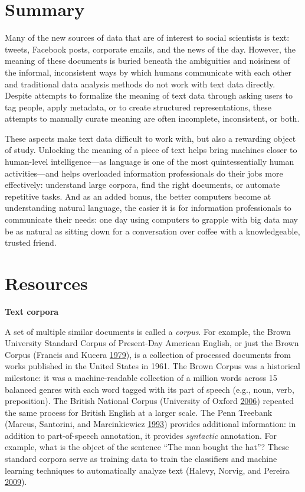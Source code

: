 \documentclass[]{krantz}
\begin{document}
\section{Summary}\label{summary-4}

Many of the new sources of data that are of interest to social
scientists is text: tweets, Facebook posts, corporate emails, and the
news of the day. However, the meaning of these documents is buried
beneath the ambiguities and noisiness of the informal, inconsistent ways
by which humans communicate with each other and traditional data
analysis methods do not work with text data directly. Despite attempts
to formalize the meaning of text data through asking users to tag
people, apply metadata, or to create structured representations, these
attempts to manually curate meaning are often incomplete, inconsistent,
or both.

These aspects make text data difficult to work with, but also a
rewarding object of study. Unlocking the meaning of a piece of text
helps bring machines closer to human-level intelligence---as language is
one of the most quintessentially human activities---and helps overloaded
information professionals do their jobs more effectively: understand
large corpora, find the right documents, or automate repetitive tasks.
And as an added bonus, the better computers become at understanding
natural language, the easier it is for information professionals to
communicate their needs: one day using computers to grapple with big
data may be as natural as sitting down for a conversation over coffee
with a knowledgeable, trusted friend.

\section{Resources}\label{resources-3}

\textbf{Text corpora}

A set of multiple similar documents is called a \emph{corpus}. For
example, the Brown University Standard Corpus of Present-Day American
English, or just the Brown Corpus (Francis and Kucera
\protect\hyperlink{ref-browncorpus}{1979}), is a collection of processed
documents from works published in the United States in 1961. The Brown
Corpus was a historical milestone: it was a machine-readable collection
of a million words across 15 balanced genres with each word tagged with
its part of speech (e.g., noun, verb, preposition). The British National
Corpus (University of Oxford \protect\hyperlink{ref-bnc}{2006}) repeated
the same process for British English at a larger scale. The Penn
Treebank (Marcus, Santorini, and Marcinkiewicz
\protect\hyperlink{ref-marcus-93}{1993}) provides additional
information: in addition to part-of-speech annotation, it provides
\emph{syntactic} annotation. For example, what is the object of the
sentence ``The man bought the hat''? These standard corpora serve as
training data to train the classifiers and machine learning techniques
to automatically analyze text (Halevy, Norvig, and Pereira
\protect\hyperlink{ref-halevy-09}{2009}).
\end{document}
